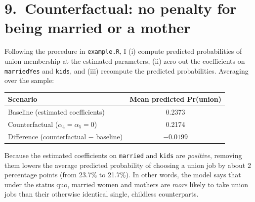 \documentclass[11pt]{article}
\begin{document}
\section*{9.\ Counterfactual: no penalty for being married or a mother}
Following the procedure in \texttt{example.R}, I (i) compute predicted
probabilities of union membership at the estimated parameters, (ii) zero out
the coefficients on \texttt{marriedYes} and \texttt{kids}, and (iii)
recompute the predicted probabilities.  Averaging over the sample:
\begin{center}
    \begin{tabular}{lc}
        \toprule
        Scenario & Mean predicted Pr(union) \\
        \midrule
        Baseline (estimated coefficients)               & 0.2373 \\
        Counterfactual ($\alpha_4 = \alpha_5 = 0$)      & 0.2174 \\
        \midrule
        Difference (counterfactual $-$ baseline)        & $-0.0199$ \\
        \bottomrule
    \end{tabular}
\end{center}
Because the estimated coefficients on \texttt{married} and \texttt{kids} are
\emph{positive}, removing them lowers the average predicted probability of
choosing a union job by about 2 percentage points (from 23.7\% to 21.7\%).
In other words, the model says that under the status quo, married women and
mothers are \emph{more} likely to take union jobs than their otherwise
identical single, childless counterparts.
\end{document}

